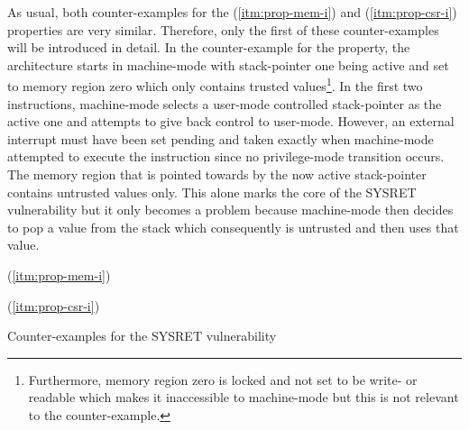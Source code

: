 As usual, both counter-examples for the  (\ref{itm:prop-mem-i}) and  (\ref{itm:prop-csr-i}) properties are very similar.
Therefore, only the first of these counter-examples will be introduced in detail.
In the counter-example for the  property, the architecture starts in machine-mode with stack-pointer one being active and set to memory region zero which only contains trusted values\footnote{%
    Furthermore, memory region zero is locked and not set to be write- or readable which makes it inaccessible to machine-mode but this is not relevant to the counter-example.
}.
In the first two instructions, machine-mode selects a user-mode controlled stack-pointer as the active one and attempts to give back control to user-mode.
However, an external interrupt must have been set pending and taken exactly when machine-mode attempted to execute the  instruction since no privilege-mode transition occurs.
The memory region that is pointed towards by the now active stack-pointer contains untrusted values only.
This alone marks the core of the SYSRET vulnerability but it only becomes a problem because machine-mode then decides to pop a value from the stack which consequently is untrusted and then uses that value.

\begin{table}
    \begin{subtable}{\textwidth}
        \centering
        
        \caption{ (\ref{itm:prop-mem-i})}
        \label{tbl:cex-mem-i-sysret}
    \end{subtable}

    \begin{subtable}{\textwidth}
        \centering
        
        \caption{ (\ref{itm:prop-csr-i})}
        \label{tbl:cex-csr-i-sysret}
    \end{subtable}
    \caption{Counter-examples for the SYSRET vulnerability}
    \label{tbl:cex-sysret}
\end{table}
